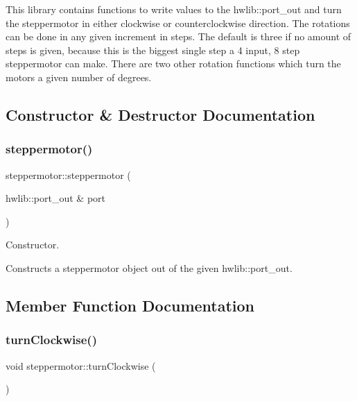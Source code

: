 This library contains functions to write values to the hwlib\+::port\+\_\+out and turn the steppermotor in either clockwise or counterclockwise direction. The rotations can be done in any given increment in steps. The default is three if no amount of steps is given, because this is the biggest single step a 4 input, 8 step steppermotor can make. There are two other rotation functions which turn the motors a given number of degrees. 

\subsection{Constructor \& Destructor Documentation}
\mbox{\label{classsteppermotor_ac1070c1bc6c18ce902f605b13b35ae17}} 
\subsubsection{\texorpdfstring{steppermotor()}{steppermotor()}}
{\footnotesize\ttfamily steppermotor\+::steppermotor (\begin{DoxyParamCaption}\item[{hwlib\+::port\+\_\+out \&}]{port }\end{DoxyParamCaption})}



Constructor. 

Constructs a steppermotor object out of the given hwlib\+::port\+\_\+out. 

\subsection{Member Function Documentation}
\mbox{\label{classsteppermotor_a5aed1fb2d8dd46435a5bc8139939c598}} 
\subsubsection{\texorpdfstring{turn\+Clockwise()}{turnClockwise()}\hspace{0.1cm}{\footnotesize\ttfamily [1/2]}}
{\footnotesize\ttfamily void steppermotor\+::turn\+Clockwise (\begin{DoxyParamCaption}{ }\end{DoxyParamCaption})\hspace{0.3cm}{\ttfamily [virtual]}}



